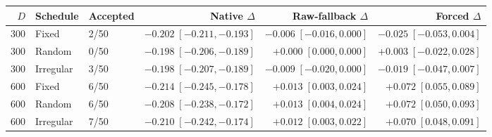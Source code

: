 \begin{tabular}{rllrrr}
\toprule
$D$ & Schedule & Accepted & Native $\Delta$ & Raw-fallback $\Delta$ & Forced $\Delta$ \\
\midrule
300 & Fixed & 2/50 & $-0.202\;[-0.211,-0.193]$ & $-0.006\;[-0.016,0.000]$ & $-0.025\;[-0.053,0.004]$ \\
300 & Random & 0/50 & $-0.198\;[-0.206,-0.189]$ & $+0.000\;[0.000,0.000]$ & $+0.003\;[-0.022,0.028]$ \\
300 & Irregular & 3/50 & $-0.198\;[-0.207,-0.189]$ & $-0.009\;[-0.020,0.000]$ & $-0.019\;[-0.047,0.007]$ \\
600 & Fixed & 6/50 & $-0.214\;[-0.245,-0.178]$ & $+0.013\;[0.003,0.024]$ & $+0.072\;[0.055,0.089]$ \\
600 & Random & 6/50 & $-0.208\;[-0.238,-0.172]$ & $+0.013\;[0.004,0.024]$ & $+0.072\;[0.050,0.093]$ \\
600 & Irregular & 7/50 & $-0.210\;[-0.242,-0.174]$ & $+0.012\;[0.003,0.022]$ & $+0.070\;[0.048,0.091]$ \\
\bottomrule
\end{tabular}
